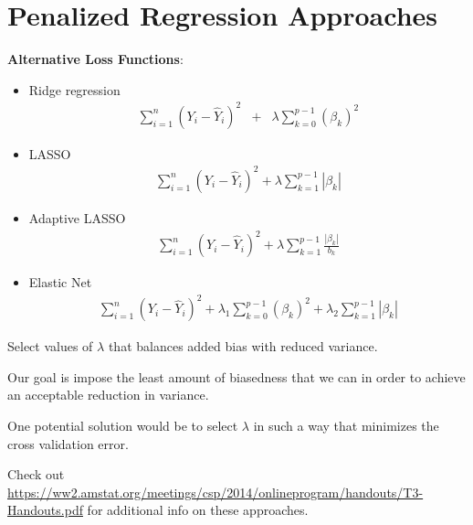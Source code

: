 \documentclass[12pt]{notes}
\begin{document}
\section{Penalized Regression Approaches}
\textbf{Alternative Loss Functions}:
\begin{itemize}
  \item Ridge regression
  \begin{eqnarray}
      \sum_{i=1}^{n} \left( Y_i - \hat{Y}_i \right)^2 & + & \lambda \sum_{k=0}^{p-1} \left(\beta_k \right)^2 \nonumber
  \end{eqnarray}
  \item LASSO
  \begin{eqnarray}
    \sum_{i=1}^{n} \left( Y_i - \hat{Y}_i \right)^2 + \lambda \sum_{k=1}^{p-1} |\beta_k| \nonumber
  \end{eqnarray}
  \item Adaptive LASSO
  \begin{eqnarray}
    \sum_{i=1}^{n} \left( Y_i - \hat{Y}_i \right)^2 + \lambda \sum_{k=1}^{p-1} \frac{|\beta_k|}{b_k} \nonumber
  \end{eqnarray}
   \item Elastic Net
  \begin{eqnarray}
    \sum_{i=1}^{n} \left( Y_i - \hat{Y}_i \right)^2 + \lambda_1 \sum_{k=0}^{p-1} \left(\beta_k \right)^2 + \lambda_2 \sum_{k=1}^{p-1} |\beta_k| \nonumber
  \end{eqnarray}
\end{itemize}

\nspace
\bi
\item Select values of $\lambda$ that balances added bias with reduced variance. 
\item Our goal is impose the least amount of biasedness that we can in order to achieve an acceptable reduction in variance. 
\item One potential solution would be to select $\lambda$ in such a way that minimizes the cross validation error. 
\ei

\nspace
Check out \url{https://ww2.amstat.org/meetings/csp/2014/onlineprogram/handouts/T3-Handouts.pdf} for additional info on these approaches. 


 \begin{minipage}[l][2cm][c]{\textwidth}

\end{minipage}
\end{document}
